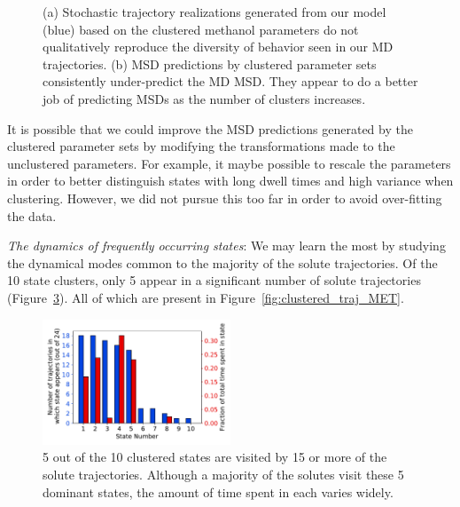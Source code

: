 \documentclass[journal=jpcbfk,manuscript=article]{achemso}
\begin{document}
\begin{figure}
\begin{subfigure}{0.35\textwidth}
  \caption{}\label{fig:clustered_MSD}
  \end{subfigure}
  \caption{(a) Stochastic trajectory realizations generated from our model (blue) based on
  the clustered methanol parameters do not qualitatively reproduce the diversity of behavior
  seen in our MD trajectories. (b) MSD predictions by clustered parameter sets consistently
  under-predict the MD MSD. They appear to do a better job of predicting MSDs as the number
  of clusters increases.}\label{fig:clustered_dynamics}
  \end{figure}
  
  It is possible that we could improve the MSD predictions generated by the 
  clustered parameter sets by modifying the transformations made to the
  unclustered parameters. For example, it maybe possible to rescale the
  parameters in order to better distinguish states with long dwell times
  and high variance when clustering.
  However, we did not pursue this too far in order to avoid over-fitting the data.
  
  \textit{The dynamics of frequently occurring states}: We may learn the most by 
  studying the dynamical modes common to the majority of the solute trajectories.
  Of the 10 state clusters, only 5 appear in a significant number of solute 
  trajectories (Figure~\ref{fig:prevalence}). All of which are present in 
  Figure~\ref{fig:clustered_traj_MET}. 
  
  
  \begin{figure}
  \centering
  \includegraphics[width=0.5\textwidth]{prevalence.pdf}
  \caption{5 out of the 10 clustered states are visited by 15 or more of the solute
  trajectories. Although a majority of the solutes visit these 5 dominant states, the
  amount of time spent in each varies widely. 
  }
  \label{fig:prevalence}
  \end{figure}
  
\end{document}
